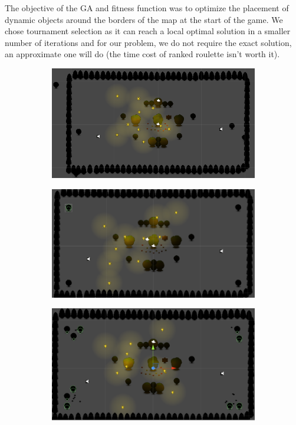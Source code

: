 The objective of the GA and fitness function was to optimize the placement of dynamic objects around the borders
of the map at the start of the game. 
We chose tournament selection as it can reach a local optimal solution in a smaller number of 
iterations and for our problem, we do not require the exact solution, an approximate one will do (the time cost 
of ranked roulette isn't worth it).
\begin{figure}[h]
        \centering
        \begin{subfigure}[b]{0.482\linewidth}
                \includegraphics[width=\linewidth]{./ga_n1}
                \caption{}
                \label{fig:ga_step1}
        \end{subfigure}
        \begin{subfigure}[b]{0.49\linewidth}
                \includegraphics[width=\linewidth]{./ga_n2}
                \caption{}
                \label{fig:ga_step2}
        \end{subfigure}
        \begin{subfigure}[b]{0.5\linewidth}
                \includegraphics[width=\linewidth]{./ga_n3}

\end{subfigure}
\end{figure}
